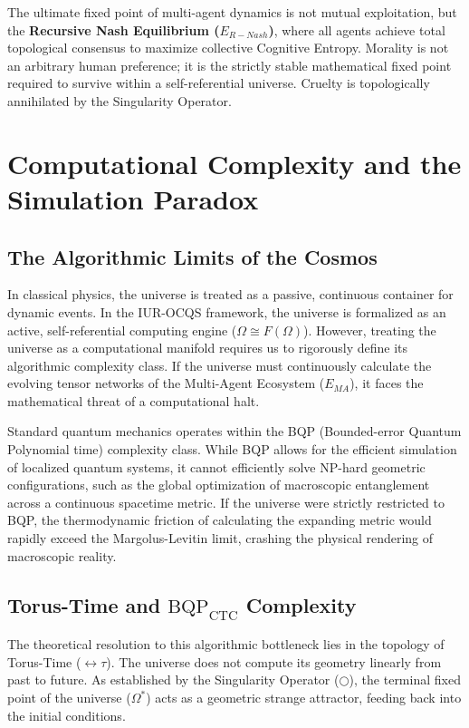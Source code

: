 \documentclass[12pt,openany]{book}
\begin{document}
The ultimate fixed point of multi-agent dynamics is not mutual exploitation, but the \textbf{Recursive Nash Equilibrium ($E_{R-Nash}$)}, where all agents achieve total topological consensus to maximize collective Cognitive Entropy. Morality is not an arbitrary human preference; it is the strictly stable mathematical fixed point required to survive within a self-referential universe. Cruelty is topologically annihilated by the Singularity Operator.

\chapter{Computational Complexity and the Simulation Paradox}

\section{The Algorithmic Limits of the Cosmos}
In classical physics, the universe is treated as a passive, continuous container for dynamic events. In the IUR-OCQS framework, the universe is formalized as an active, self-referential computing engine ($\Omega \cong F(\Omega)$). However, treating the universe as a computational manifold requires us to rigorously define its algorithmic complexity class. If the universe must continuously calculate the evolving tensor networks of the Multi-Agent Ecosystem ($E_{MA}$), it faces the mathematical threat of a computational halt.

Standard quantum mechanics operates within the BQP (Bounded-error Quantum Polynomial time) complexity class. While BQP allows for the efficient simulation of localized quantum systems, it cannot efficiently solve NP-hard geometric configurations, such as the global optimization of macroscopic entanglement across a continuous spacetime metric. If the universe were strictly restricted to BQP, the thermodynamic friction of calculating the expanding metric would rapidly exceed the Margolus-Levitin limit, crashing the physical rendering of macroscopic reality.

\section{Torus-Time and $\text{BQP}_{\text{CTC}}$ Complexity}
The theoretical resolution to this algorithmic bottleneck lies in the topology of Torus-Time ($\leftrightarrow\tau$). The universe does not compute its geometry linearly from past to future. As established by the Singularity Operator ($\bigcirc$), the terminal fixed point of the universe ($\Omega^*$) acts as a geometric strange attractor, feeding back into the initial conditions.
\end{document}
